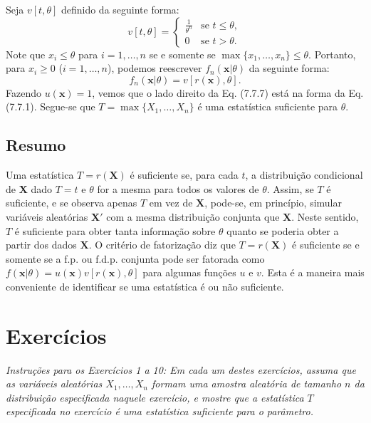 Seja $v[t, \theta]$ definido da seguinte forma:
\[ v[t, \theta] = 
\begin{cases} 
\frac{1}{\theta^n} & \text{se } t \le \theta, \\ 
0 & \text{se } t > \theta. 
\end{cases} \]
Note que $x_i \le \theta$ para $i=1, \dots, n$ se e somente se $\max\{x_1, \dots, x_n\} \le \theta$. Portanto, para $x_i \ge 0$ ($i=1, \dots, n$), podemos reescrever $f_n(\mathbf{x}|\theta)$ da seguinte forma:
\begin{equation}
f_n(\mathbf{x}|\theta) = v[r(\mathbf{x}), \theta]. \tag{7.7.7}
\end{equation}
Fazendo $u(\mathbf{x})=1$, vemos que o lado direito da Eq. (7.7.7) está na forma da Eq. (7.7.1). Segue-se que $T=\max\{X_1, \dots, X_n\}$ é uma estatística suficiente para $\theta$.

\subsection*{Resumo}

Uma estatística $T=r(\mathbf{X})$ é suficiente se, para cada $t$, a distribuição condicional de $\mathbf{X}$ dado $T=t$ e $\theta$ for a mesma para todos os valores de $\theta$. Assim, se $T$ é suficiente, e se observa apenas $T$ em vez de $\mathbf{X}$, pode-se, em princípio, simular variáveis aleatórias $\mathbf{X}'$ com a mesma distribuição conjunta que $\mathbf{X}$. Neste sentido, $T$ é suficiente para obter tanta informação sobre $\theta$ quanto se poderia obter a partir dos dados $\mathbf{X}$. O critério de fatorização diz que $T=r(\mathbf{X})$ é suficiente se e somente se a f.p. ou f.d.p. conjunta pode ser fatorada como $f(\mathbf{x}|\theta) = u(\mathbf{x})v[r(\mathbf{x}), \theta]$ para algumas funções $u$ e $v$. Esta é a maneira mais conveniente de identificar se uma estatística é ou não suficiente.


\section*{Exercícios}

\noindent\textit{Instruções para os Exercícios 1 a 10: Em cada um destes exercícios, assuma que as variáveis aleatórias $X_1, \dots, X_n$ formam uma amostra aleatória de tamanho $n$ da distribuição especificada naquele exercício, e mostre que a estatística $T$ especificada no exercício é uma estatística suficiente para o parâmetro.}

